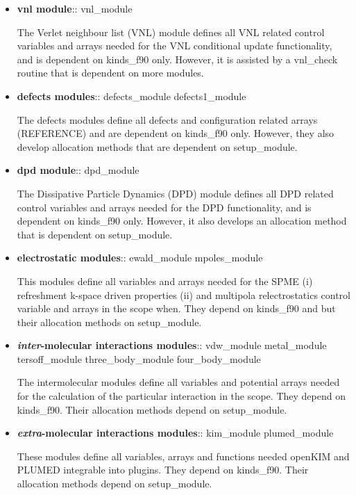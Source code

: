 \begin{itemize}
\item {\bf vnl module}:: {\sc vnl\_module}

The Verlet neighbour list (VNL) module defines all VNL related
control variables and arrays needed for the VNL conditional
update functionality, and is dependent on {\sc kinds\_f90} only.
However, it is assisted by a {\sc vnl\_check} routine that is
dependent on more modules.

\item {\bf defects modules}:: {\sc defects\_module defects1\_module}

The defects modules define all defects and configuration related
arrays (REFERENCE) and are dependent on {\sc kinds\_f90} only.
However, they also develop allocation methods that are dependent
on {\sc setup\_module}.

\item {\bf dpd module}:: {\sc dpd\_module}

The Dissipative Particle Dynamics (DPD) module defines all DPD related
control variables and arrays needed for the DPD functionality, and is
dependent on {\sc kinds\_f90} only.  However, it also develops an
allocation method that is dependent on {\sc setup\_module}.

\item {\bf electrostatic modules}:: {\sc ewald\_module mpoles\_module}

This modules define all variables and arrays needed for the
SPME (i) refreshment k-space driven properties (ii) and
multipola relectrostatics control variable and arrays in the
\D scope when.  They depend on {\sc kinds\_f90} and but their
allocation methods on {\sc setup\_module}.

\item {\bf {\em inter}-molecular interactions modules}:: {\sc
vdw\_module metal\_module \\
tersoff\_module three\_body\_module four\_body\_module}

The intermolecular modules define all variables and potential
arrays needed for the calculation of the particular interaction in
the \D scope.  They depend on {\sc kinds\_f90}.  Their allocation
methods depend on {\sc setup\_module}.

\item {\bf {\em extra}-molecular interactions modules}:: {\sc
kim\_module plumed\_module}

These modules define all variables, arrays and functions needed
openKIM and PLUMED integrable into \D plugins.  They depend on
{\sc kinds\_f90}.  Their allocation methods depend on {\sc setup\_module}.


\end{itemize}
